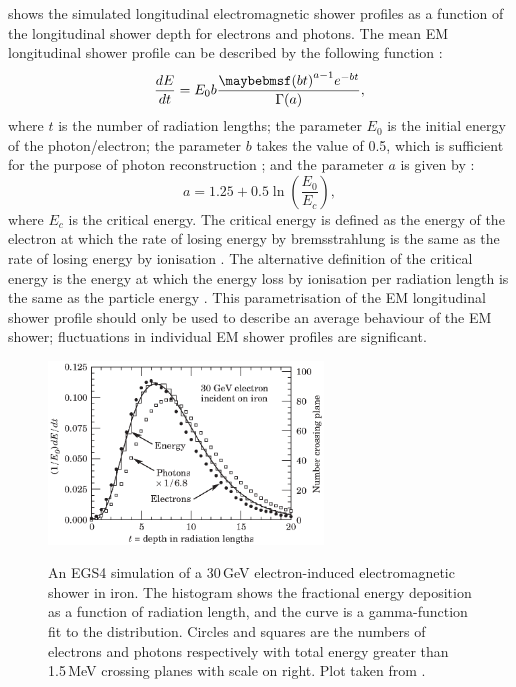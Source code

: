  shows the simulated longitudinal electromagnetic shower profiles as a function of the longitudinal shower depth for electrons and photons. The mean EM longitudinal shower profile can be described by the following function \cite{Longo:1975wb}:
\begin{equation}
\frac{dE}{dt} = E_0 b \frac{\parenths{bt}^{a-1}e^{-bt}}{\Gamma(a)},
\label{eq:photonEMshower}
\end{equation}
where $t$ is the number of radiation lengths; the parameter $E_0$ is the initial energy of the photon/electron; the parameter $b$ takes the value of 0.5, which is sufficient for the purpose of photon reconstruction \cite{Agashe:2014kda}; and the parameter $a$ is given by \cite{Thomson:2009rp}:
\begin{equation}
a = 1.25 + 0.5\ln\left(\frac{E_0}{E_c}\right),
\end{equation}
where $E_c$ is the critical energy. The critical energy is defined as the energy of the electron at which the rate of losing energy by bremsstrahlung is the same as the rate of losing energy by ionisation \cite{1964NASSP3012.....B}. The alternative definition of the critical energy is the energy at which the energy loss by ionisation per radiation length is the same as the particle energy \cite{rossi1952high}. This parametrisation of the EM longitudinal shower profile should only be used to describe an average behaviour of the EM shower; fluctuations in individual EM shower profiles are significant.



\begin{figure}[tbph]
\centering
{\includegraphics[width=0.65\textwidth]{photon/EMlong}}
\caption[Simulated longitudinal electromagnetic shower profile as a function of depth for electrons and photons.]
{An EGS4 \cite{Ford:1978jp,Hirayama:296198} simulation of a 30\,GeV electron-induced electromagnetic shower in iron. The histogram shows the fractional energy deposition as a function of radiation length, and the curve is a gamma-function fit to the distribution. Circles and squares are the numbers of electrons and photons respectively with total energy greater than 1.5\,MeV crossing planes with scale on right. Plot taken from \cite{Agashe:2014kda}.}
\label{fig:photonEMlongProfile}
\end{figure}

